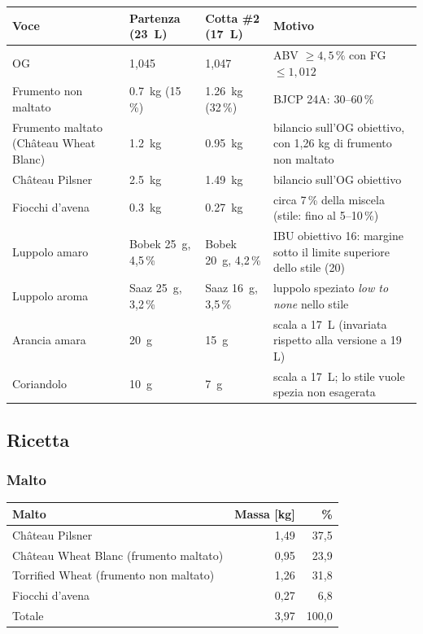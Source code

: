 \begin{tabularx}{\linewidth}{@{}lXXX@{}}
\toprule
Voce & Partenza (\SI{23}{\liter}) & Cotta \#2 (\SI{17}{\liter}) & Motivo \\
\midrule
OG & 1,045 & 1,047 & ABV $\ge 4{,}5\,\%$ con FG $\le 1{,}012$ \\
Frumento non maltato & \SI{0,7}{\kilo\gram} (15\,\%) & \SI{1,26}{\kilo\gram} (32\,\%) & BJCP 24A: 30--60\,\% \\
Frumento maltato (Château Wheat Blanc) & \SI{1,2}{\kilo\gram} & \SI{0,95}{\kilo\gram} & bilancio sull'OG obiettivo, con 1,26 kg di frumento non maltato \\
Château Pilsner & \SI{2,5}{\kilo\gram} & \SI{1,49}{\kilo\gram} & bilancio sull'OG obiettivo \\
Fiocchi d'avena & \SI{0,3}{\kilo\gram} & \SI{0,27}{\kilo\gram} & circa 7\,\% della miscela (stile: fino al 5--10\,\%) \\
Luppolo amaro & Bobek \SI{25}{\gram}, 4,5\,\% & Bobek \SI{20}{\gram}, 4,2\,\% & IBU obiettivo 16: margine sotto il limite superiore dello stile (20) \\
Luppolo aroma & Saaz \SI{25}{\gram}, 3,2\,\% & Saaz \SI{16}{\gram}, 3,5\,\% & luppolo speziato \emph{low to none} nello stile \\
Arancia amara & \SI{20}{\gram} & \SI{15}{\gram} & scala a \SI{17}{\liter} (invariata rispetto alla versione a 19 L) \\
Coriandolo & \SI{10}{\gram} & \SI{7}{\gram} & scala a \SI{17}{\liter}; lo stile vuole spezia non esagerata \\
\bottomrule
\end{tabularx}

\subsection*{Ricetta}

\subsubsection*{Malto}
\begin{tabularx}{\linewidth}{@{}Xrr@{}}
\toprule
Malto & Massa [\si{\kilo\gram}] & \% \\
\midrule
Château Pilsner & 1,49 & 37,5 \\
Château Wheat Blanc (frumento maltato) & 0,95 & 23,9 \\
Torrified Wheat (frumento non maltato) & 1,26 & 31,8 \\
Fiocchi d'avena & 0,27 & 6,8 \\
\midrule
Totale & 3,97 & 100,0 \\
\bottomrule
\end{tabularx}

